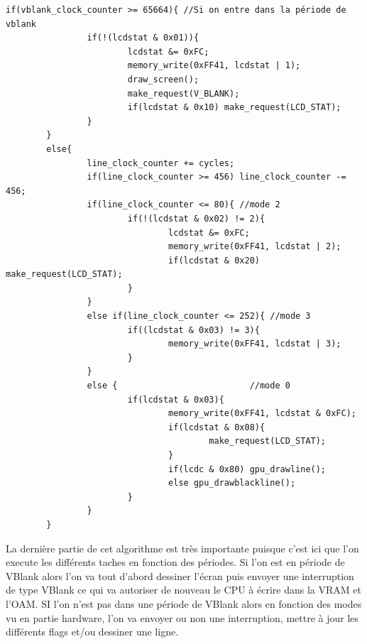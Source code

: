 \documentclass{report}
\begin{document}
\begin{lstlisting}
if(vblank_clock_counter >= 65664){ //Si on entre dans la période de vblank
                if(!(lcdstat & 0x01)){
                        lcdstat &= 0xFC;
                        memory_write(0xFF41, lcdstat | 1);
                        draw_screen();
                        make_request(V_BLANK);
                        if(lcdstat & 0x10) make_request(LCD_STAT);
                }
        }
        else{
                line_clock_counter += cycles;
                if(line_clock_counter >= 456) line_clock_counter -= 456;
                if(line_clock_counter <= 80){ //mode 2
                        if(!(lcdstat & 0x02) != 2){
                                lcdstat &= 0xFC;
                                memory_write(0xFF41, lcdstat | 2);
                                if(lcdstat & 0x20) make_request(LCD_STAT);
                        }
                }
                else if(line_clock_counter <= 252){ //mode 3
                        if((lcdstat & 0x03) != 3){
                                memory_write(0xFF41, lcdstat | 3);
                        }
                }
                else {                          //mode 0 
                        if(lcdstat & 0x03){
                                memory_write(0xFF41, lcdstat & 0xFC);
                                if(lcdstat & 0x08){
                                        make_request(LCD_STAT);
                                }
                                if(lcdc & 0x80) gpu_drawline();
                                else gpu_drawblackline();
                        }
                }
        }

\end{lstlisting}
La dernière partie de cet algorithme est très importante puisque c'est ici que l'on execute les différents taches en fonction des périodes. Si l'on est en période de VBlank alors l'on va tout d'abord dessiner l'écran puis envoyer une interruption de type VBlank ce qui va autoriser de nouveau le CPU à écrire dans la VRAM et l'OAM. SI l'on n'est pas dans une période de VBlank alors en fonction des modes vu en partie hardware, l'on va envoyer ou non une interruption, mettre à jour les différents flags et/ou dessiner une ligne.\\
\end{document}
